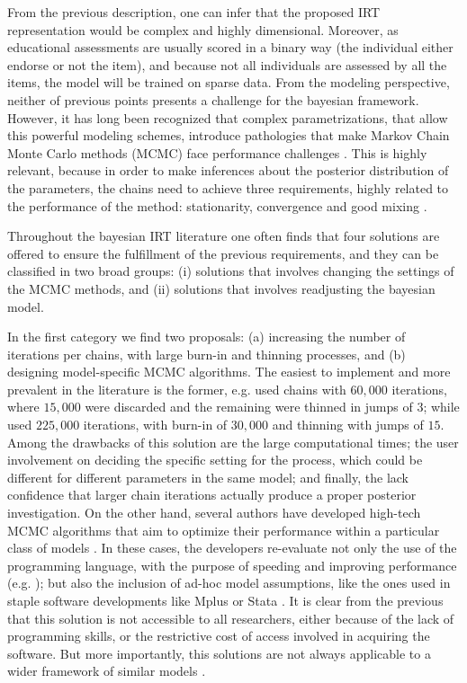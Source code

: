 From the previous description, one can infer that the proposed IRT representation would be complex and highly dimensional. Moreover, as educational assessments are usually scored in a binary way (the individual either endorse or not the item), and because not all individuals are assessed by all the items, the model will be trained on sparse data. From the modeling perspective, neither of previous points presents a challenge for the bayesian framework. However, it has long been recognized that complex parametrizations, that allow this powerful modeling schemes, introduce pathologies that make Markov Chain Monte Carlo methods (MCMC)  face performance challenges \cite{Gelfand_et_al_1995, Gelfand_et_al_1996, Papaspiliopoulos_et_al_2003, Papaspiliopoulos_et_al_2007, Betancourt_et_al_2013}. This is highly relevant, because in order to make inferences about the posterior distribution of the parameters, the chains need to achieve three requirements, highly related to the performance of the method: stationarity, convergence and good mixing \cite{McElreath_2020}.

Throughout the bayesian IRT literature one often finds that four solutions are offered to ensure the fulfillment of the previous requirements, and they can be classified in two broad groups: (i) solutions that involves changing the settings of the MCMC methods, and (ii) solutions that involves readjusting the bayesian model. 

In the first category we find two proposals: (a) increasing the number of iterations per chains, with large burn-in and thinning processes, and (b) designing model-specific MCMC algorithms. The easiest to implement and more prevalent in the literature is the former, e.g. \citet{Fujimoto_2018a} used chains with $60,000$ iterations, where $15,000$ were discarded and the remaining were thinned in jumps of $3$; while \citet{Fujimoto_2018b} used $225,000$ iterations, with burn-in of $30,000$ and thinning with jumps of $15$. Among the drawbacks of this solution are the large computational times; the user involvement on deciding the specific setting for the process, which could be different for different parameters in the same model; and finally, the lack confidence that larger chain iterations actually produce a proper posterior investigation. On the other hand, several authors have developed high-tech MCMC algorithms that aim to optimize their performance within a particular class of models \cite{Papaspiliopoulos_et_al_2007}. In these cases, the developers re-evaluate not only the use of the programming language, with the purpose of speeding and improving performance (e.g. \citet{Fujimoto_2018a}); but also the inclusion of ad-hoc model assumptions, like the ones used in staple software developments like Mplus \cite{Muthen_et_al_2011} or Stata \cite{Rabe_et_al_2004c}. It is clear from the previous that this solution is not accessible to all researchers, either because of the lack of programming skills, or the restrictive cost of access involved in acquiring the software. But more importantly, this solutions are not always applicable to a wider framework of similar models \cite{Papaspiliopoulos_et_al_2007}.

